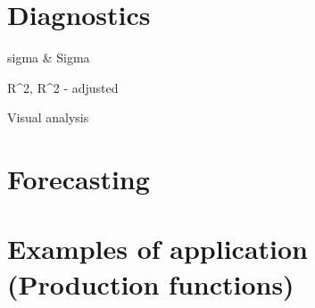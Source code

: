 \documentclass[
]{book}
\begin{document}
\hypertarget{diagnostics}{%
\section{Diagnostics}\label{diagnostics}}

sigma \& Sigma

R\^{}2, R\^{}2 - adjusted

Visual analysis

\hypertarget{forecasting}{%
\section{Forecasting}\label{forecasting}}

\hypertarget{examples-of-application-production-functions}{%
\section{Examples of application (Production functions)}\label{examples-of-application-production-functions}}

  
\end{document}
